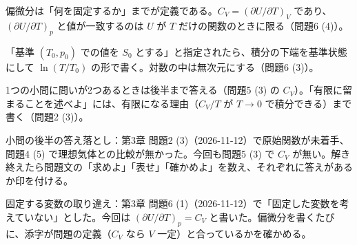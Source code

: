 \documentclass[uplatex,dvipdfmx,a4paper,11pt]{jsarticle}
\begin{document}
\matome
\begin{saitenichiran}
\end{saitenichiran}
\begin{daiji}
  \item 偏微分は「何を固定するか」までが定義である。$C_{V}=(\partial U/\partial T)_{V}$ であり、$(\partial U/\partial T)_{p}$ と値が一致するのは $U$ が $T$ だけの関数のときに限る（問題6 (4)）。
  \item 「基準 $(T_{0},p_{0})$ での値を $S_{0}$ とする」と指定されたら、積分の下端を基準状態にして $\ln(T/T_{0})$ の形で書く。対数の中は無次元にする（問題6 (3)）。
  \item 1つの小問に問いが2つあるときは後半まで答える（問題5 (3) の $C_{V}$）。「有限に留まることを述べよ」には、有限になる理由（$C_{V}/T$ が $T\to0$ で積分できる）まで書く（問題2 (3)）。
\end{daiji}
\begin{maemo}
  \item 小問の後半の答え落とし：第3章 問題2 (3)（2026-11-12）で原始関数が未着手、問題4 (5) で理想気体との比較が無かった。今回も問題5 (3) で $C_{V}$ が無い。解き終えたら問題文の「求めよ」「表せ」「確かめよ」を数え、それぞれに答えがあるか印を付ける。
  \item 固定する変数の取り違え：第3章 問題6 (1)（2026-11-12）で「固定した変数を考えていない」とした。今回は $(\partial U/\partial T)_{p}=C_{V}$ と書いた。偏微分を書くたびに、添字が問題の定義（$C_{V}$ なら $V$ 一定）と合っているかを確かめる。
\end{maemo}
\end{document}
